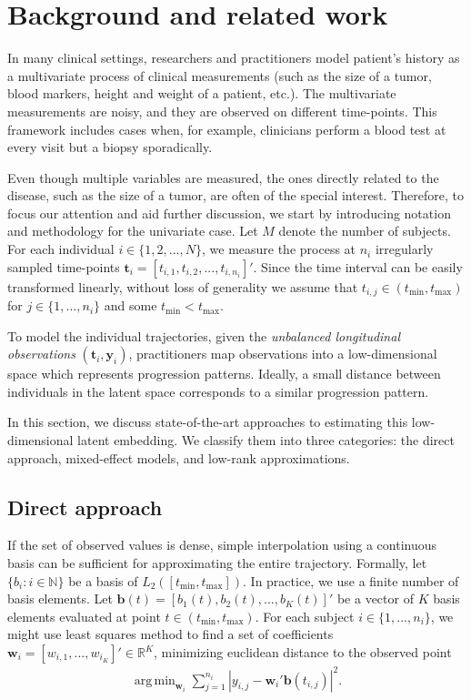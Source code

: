 \documentclass[preprint]{imsart}
\numberwithin{equation}{section}
\theoremstyle{plain}
\newcommand{\R}{\mathbb{R}}
\newcommand{\N}{\mathbb{N}}
\newcommand{\bb}{\mathbf{b}}
\newcommand{\bw}{\mathbf{w}}
\DeclareMathOperator*{\argmin}{arg\,min}
\begin{document}
\section{Background and related work}\label{s:background}

In many clinical settings, researchers and practitioners model patient's history as a multivariate process of clinical measurements (such as the size of a tumor, blood markers, height and weight of a patient, etc.). The multivariate measurements are noisy, and they are observed on different time-points. This framework includes cases when, for example, clinicians perform a blood test at every visit but a biopsy sporadically. 

Even though multiple variables are measured, the ones directly related to the disease, such as the size of a tumor, are often of the special interest. Therefore, to focus our attention and aid further discussion, we start by introducing notation and methodology for the univariate case. Let $M$ denote the number of subjects. For each individual $i \in \{ 1,2,...,N \}$, we measure the process at $n_i$ irregularly sampled time-points $\mathbf{t}_i = [t_{i,1},t_{i,2},...,t_{i,n_i}]'$. Since the time interval can be easily transformed linearly, without loss of generality we assume that $t_{i,j} \in (t_{\min},t_{\max})$ for $ j \in \{1,...,n_i\}$ and some $t_{\min} < t_{\max}$.

To model the individual trajectories, given the {\it unbalanced longitudinal observations} $(\mathbf{t}_i,\mathbf{y}_i)$, practitioners map observations into a low-dimensional space which represents progression patterns. Ideally, a small distance between individuals in the latent space corresponds to a similar progression pattern.

In this section, we discuss state-of-the-art approaches to estimating this low-dimensional latent embedding. We classify them into three categories: the direct approach, mixed-effect models, and low-rank approximations. 

\subsection{Direct approach}\label{ss:direct}

If the set of observed values is dense, simple interpolation using a continuous basis can be sufficient for approximating the entire trajectory. Formally, let $\{b_i: i \in \N \}$ be a basis of $L_2([t_{\min},t_{\max}])$. In practice, we use a finite number of basis elements. Let $\bb(t) = [b_1(t),b_2(t),...,b_K(t)]'$ be a vector of $K$ basis elements evaluated at point $t \in (t_{\min},t_{\max})$. For each subject $i \in \{ 1,...,n_i \}$, we might use least squares method to find a set of coefficients $\bw_i = [w_{i,1},...,w_{i_K}]' \in \R^K$, minimizing euclidean distance to the observed point
\begin{align}\label{eq:direct-individual}
 \argmin_{\bw_i}\sum_{j=1}^{n_i}\left|y_{i,j} - \bw_i'\bb(t_{i,j})\right|^2.
\end{align}
\end{document}
